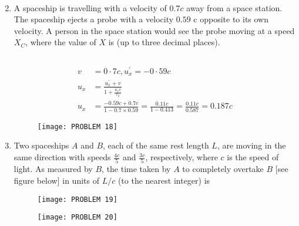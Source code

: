 \begin{enumerate}
\begin{answer}
\begin{align*}
	\end{align*}
\end{answer}
	\item A spaceship is travelling with a velocity of $0.7 c$ away from a space station. The spaceship ejects a probe with a velocity $0.59$ c opposite to its own velocity. A person in the space station would see the probe moving at a speed $X_{C}$, where the value of $X$ is (up to three decimal places).
	{}
\begin{answer}$\left. \right. $\\
	\begin{minipage}{0.5\textwidth}
	\begin{align*}
	v&=0 \cdot 7 c, u_{x}^{\prime}=-0 \cdot 59 c\\
	u_{x}&=\frac{u_{x}^{\prime}+v}{1+\frac{u_{x}^{\prime} v}{c_{2}}}\\
	u_{x}&=\frac{-0.59 c+0.7 c}{1-0.7 \times 0.59}=\frac{0.11 c}{1-0.413}=\frac{0.11 c}{0.587}=0.187 c
	\end{align*}
	\end{minipage}
\begin{minipage}{0.5\textwidth}
\begin{figure}[H]
	\centering
	\texttt{[image: PROBLEM 18]}
\end{figure}		
\end{minipage}
\end{answer}
	\item Two spaceships $A$ and $B$, each of the same rest length $L$, are moving in the same direction with speeds $\frac{4 c}{5}$ and $\frac{3 c}{5}$, respectively, where $c$ is the speed of light. As measured by $B$, the time taken by $A$ to completely overtake $B$ [see figure below] in units of $L / c$ (to the nearest integer) is
	{}$\left. \right. $\\
	\begin{minipage}{0.5\textwidth}
	\begin{figure}[H]
		\centering
		\texttt{[image: PROBLEM 19]}
	\end{figure}	
	\end{minipage}
\begin{minipage}{0.5\textwidth}
	\begin{figure}[H]
		\centering
		\texttt{[image: PROBLEM 20]}
	\end{figure}
\end{minipage}
\begin{answer}

\end{answer}
\end{enumerate}
